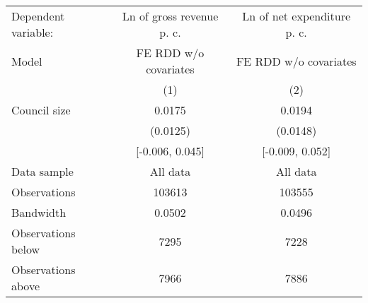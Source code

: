 \begin{tabular}{lcc}
  \toprule
 \midrule
Dependent variable: & Ln of gross revenue p. c. & Ln of net expenditure p. c. \\ 
 Model & FE RDD w/o covariates & FE RDD w/o covariates \\ 
   & (1) & (2) \\ 
   \midrule
Council size & 0.0175 & 0.0194 \\ 
   & (0.0125) & (0.0148) \\ 
   & [-0.006, 0.045] & [-0.009, 0.052] \\ 
   \midrule
Data sample & All data & All data \\ 
  Observations & 103613 & 103555 \\ 
  Bandwidth & 0.0502 & 0.0496 \\ 
  Observations below & 7295 & 7228 \\ 
  Observations above & 7966 & 7886 \\ 
   \midrule
 \bottomrule
\end{tabular}
